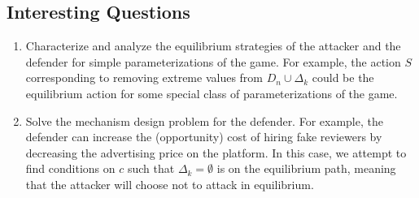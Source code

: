 \documentclass{article}
\begin{document}
\subsection{Interesting Questions}
\begin{enumerate}
\item Characterize and analyze the equilibrium strategies of the attacker and the defender for simple parameterizations of the game. For example, the action $S $ corresponding to removing extreme values from $D_{n} \cup \Delta_{k}$ could be the equilibrium action for some special class of parameterizations of the game.
\item Solve the mechanism design problem for the defender. For example, the defender can increase the (opportunity) cost of hiring fake reviewers by decreasing the advertising price on the platform. In this case, we attempt to find conditions on $c $ such that $\Delta_{k} = \emptyset$ is on the equilibrium path, meaning that the attacker will choose not to attack in equilibrium.
\end{enumerate}
\end{document}
